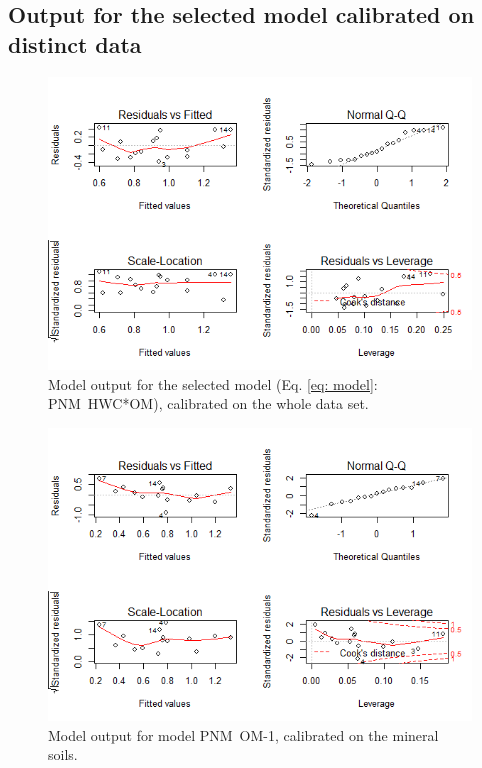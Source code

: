 \documentclass[10pt,twoside,dutch,english]{report}
\begin{document}
\begin{appendices}
\section{Output for the selected model calibrated on distinct data}
\label{chap: modplots}
	\begin{figure}[H] %
    	\centering
		\includegraphics[width=0.85\linewidth]{appendix_modout_all}
		\caption{Model output for the selected model (Eq. \ref{eq: model}: PNM~HWC*OM), calibrated on the whole data set.}
		\end{figure}
		\begin{figure}[H] %
    	\centering
		\includegraphics[width=0.85\linewidth]{appendix_modout_min_om}
		\caption{Model output for model  PNM~OM-1, calibrated on the mineral soils.}
		\end{figure}
		\begin{figure}[H] %

\end{figure}
\end{appendices}
\end{document}
